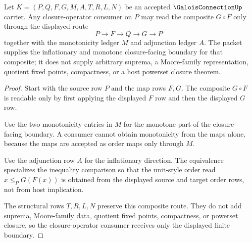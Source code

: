 \begin{theorem}
\label{thm:galois-connection-closure-operator}
Let $K=(P,Q,F,G,M,A,T,R,L,N)$ be an accepted $\GaloisConnectionUp$ carrier. Any closure-operator consumer on $P$ may read the composite $G\circ F$ only through the displayed route
$$
P \longrightarrow F \longrightarrow Q \longrightarrow G \longrightarrow P
$$
together with the monotonicity ledger $M$ and adjunction ledger $A$. The packet supplies the inflationary and monotone closure-facing boundary for that composite; it does not supply arbitrary suprema, a Moore-family representation, quotient fixed points, compactness, or a host powerset closure theorem.
\end{theorem}
\begin{proof}
Start with the source row $P$ and the map rows $F,G$. The composite $G\circ F$ is readable only by first applying the displayed $F$ row and then the displayed $G$ row.

Use the two monotonicity entries in $M$ for the monotone part of the closure-facing boundary. A consumer cannot obtain monotonicity from the maps alone, because the maps are accepted as order maps only through $M$.

Use the adjunction row $A$ for the inflationary direction. The equivalence specializes the inequality comparison so that the unit-style order read $x\leq_P G(F(x))$ is obtained from the displayed source and target order rows, not from host implication.

The structural rows $T,R,L,N$ preserve this composite route. They do not add suprema, Moore-family data, quotient fixed points, compactness, or powerset closure, so the closure-operator consumer receives only the displayed finite boundary.
\end{proof}

